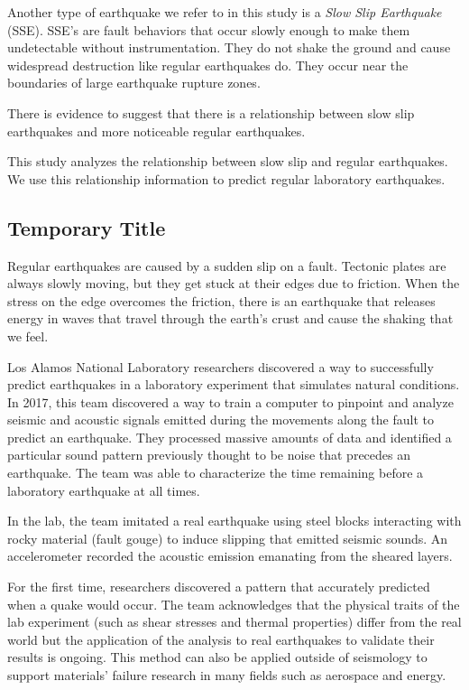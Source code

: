 \documentclass[]{llncs}
\begin{document}
Another type of earthquake we refer to in this study is a {\em 
	Slow Slip Earthquake} (SSE). SSE's are fault behaviors that occur slowly enough to make them undetectable without instrumentation. They do not shake the ground and cause widespread destruction like regular earthquakes do. They occur near the boundaries of large earthquake rupture zones\cite{Slip}. \par

There is evidence to suggest that there is a relationship between slow slip earthquakes and more noticeable regular earthquakes\cite{SlowSlip}. \par

This study analyzes the relationship between slow slip and regular earthquakes. We use this relationship information to predict regular laboratory earthquakes. \par
\subsection{Temporary Title}
Regular earthquakes are caused by a sudden slip on a fault. Tectonic plates are always slowly moving, but they get stuck at their edges due to friction. When the stress on the edge overcomes the friction, there is an earthquake that releases energy in waves that travel through the earth's crust and cause the shaking that we feel.\cite{USGSfaqs}\par

Los Alamos National Laboratory researchers discovered a way to successfully predict earthquakes in a laboratory experiment that simulates natural conditions. In 2017, this team discovered a way to train a computer to pinpoint and analyze seismic and acoustic signals emitted during the movements along the fault to predict an earthquake. They processed massive amounts of data and identified a particular sound pattern previously thought to be noise that precedes an earthquake. The team was able to characterize the time remaining before a laboratory earthquake at all times.\cite{LANLNews} \par
In the lab, the team imitated a real earthquake using steel blocks interacting with rocky material (fault gouge) to induce slipping that emitted seismic sounds. An accelerometer recorded the acoustic emission emanating from the sheared layers.\cite{LANLNews}\par

For the first time, researchers discovered a pattern that accurately predicted when a quake would occur. The team acknowledges that the physical traits of the lab experiment (such as shear stresses and thermal properties) differ from the real world but the application of the analysis to real earthquakes to validate their results is ongoing. This method can also be applied outside of seismology to support materials’ failure research in many fields such as aerospace and energy.\cite{LANLNews}\par
\end{document}

